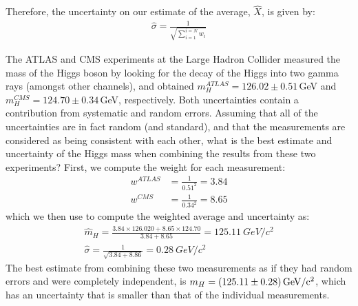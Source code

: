 Therefore, the uncertainty on our estimate of the average, $\hat X$, is given by:
\begin{align}
\hat \sigma=\frac{1}{\sqrt{\sum_{i=1}^{i=N}w_i}}
\end{align}

\begin{example}{The ATLAS and CMS experiments at the Large Hadron Collider measured the mass of the Higgs boson by looking for the decay of the Higgs into two gamma rays (amongst other channels), and obtained $m_H^{ATLAS}=126.02 \pm 0.51$\,GeV and $m_H^{CMS}=124.70 \pm 0.34$\,GeV, respectively. Both uncertainties contain a contribution from systematic and random errors. Assuming that all of the uncertainties are in fact random (and standard), and that the measurements are considered as being consistent with each other, what is the best estimate and uncertainty of the Higgs mass when combining the results from these two experiments?}
First, we compute the weight for each measurement:
\begin{align*}
w^{ATLAS}&=\frac{1}{0.51^2}=3.84\\
w^{CMS}&=\frac{1}{0.34^2}=8.65
\end{align*}
which we then use to compute the weighted average and uncertainty as:
\begin{align*}
\hat m_H=\frac{3.84\times 126.020+8.65\times 124.70}{3.84+8.65}=\SI{125.11}{GeV/c^2}\\
\hat \sigma=\frac{1}{\sqrt{3.84+8.86}}=\SI{0.28}{GeV/c^2}
\end{align*}
The best estimate from combining these two measurements as if they had random errors and were completely independent, is $m_H=\SI{125.11\pm0.28}{GeV/c^2}$, which has an uncertainty that is smaller than that of the individual measurements. 
\end{example}
\newpage
